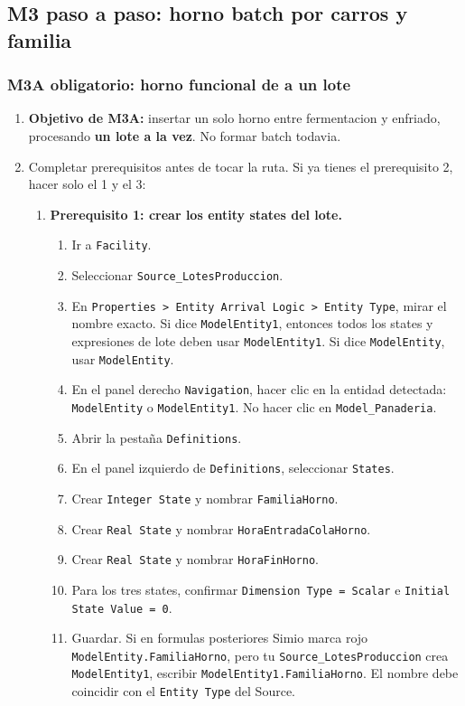 \documentclass[11pt]{article}
\newcommand{\simio}[1]{\texttt{#1}}
\newcommand{\state}[1]{\texttt{#1}}
\begin{document}
\subsection{M3 paso a paso: horno batch por carros y familia}

\subsubsection{M3A obligatorio: horno funcional de a un lote}
\begin{enumerate}
  \item \textbf{Objetivo de M3A:} insertar un solo horno entre fermentacion y enfriado, procesando \textbf{un lote a la vez}. No formar batch todavia.
  \item Completar prerequisitos antes de tocar la ruta. Si ya tienes el prerequisito 2, hacer solo el 1 y el 3:
  \begin{enumerate}
    \item \textbf{Prerequisito 1: crear los entity states del lote.}
    \begin{enumerate}
      \item Ir a \simio{Facility}.
      \item Seleccionar \simio{Source\_LotesProduccion}.
      \item En \simio{Properties > Entity Arrival Logic > Entity Type}, mirar el nombre exacto. Si dice \simio{ModelEntity1}, entonces todos los states y expresiones de lote deben usar \simio{ModelEntity1}. Si dice \simio{ModelEntity}, usar \simio{ModelEntity}.
      \item En el panel derecho \simio{Navigation}, hacer clic en la entidad detectada: \simio{ModelEntity} o \simio{ModelEntity1}. No hacer clic en \simio{Model\_Panaderia}.
      \item Abrir la pesta\~na \simio{Definitions}.
      \item En el panel izquierdo de \simio{Definitions}, seleccionar \simio{States}.
      \item Crear \simio{Integer State} y nombrar \state{FamiliaHorno}.
      \item Crear \simio{Real State} y nombrar \state{HoraEntradaColaHorno}.
      \item Crear \simio{Real State} y nombrar \state{HoraFinHorno}.
      \item Para los tres states, confirmar \simio{Dimension Type = Scalar} e \simio{Initial State Value = 0}.
      \item Guardar. Si en formulas posteriores Simio marca rojo \state{ModelEntity.FamiliaHorno}, pero tu \simio{Source\_LotesProduccion} crea \simio{ModelEntity1}, escribir \state{ModelEntity1.FamiliaHorno}. El nombre debe coincidir con el \simio{Entity Type} del Source.

\end{enumerate}
\end{enumerate}
\end{enumerate}
\end{document}

